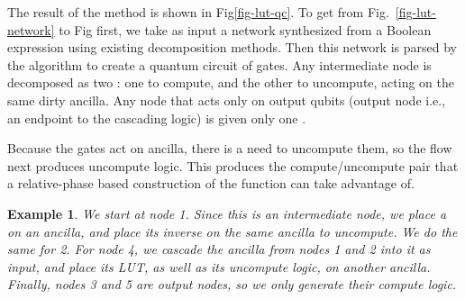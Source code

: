 \documentclass[paper]{ieice}
\newtheorem{example}{Example}
\providecommand{\DIFadd}[1]{{\protect\color{blue}{#1}}} %
\providecommand{\DIFaddbegin}{} %
\providecommand{\DIFaddend}{} %
\newcommand{\DIFaddincludegraphics}[2][]{{\color{blue}\fbox{\DIFOincludegraphics[#1]{#2}}}} %
\DeclareRobustCommand{\DIFaddbegin}{\DIFOaddbegin \let\includegraphics\DIFaddincludegraphics} %
\DeclareRobustCommand{\DIFaddend}{\DIFOaddend \let\includegraphics\DIFOincludegraphics} %
\begin{document}
The result of the method is shown in Fig\DIFaddbegin \DIFadd{. }\DIFaddend \ref{fig-lut-qc}. To get from Fig.~\ref{fig-lut-network} to Fig \DIFaddbegin \DIFadd{.~\ref{fig-lut-qc}, }\DIFaddend first, we take as input a  \DIFaddbegin \DIFadd{Boolean logic }\DIFaddend network synthesized from a Boolean expression using existing  \DIFaddbegin \DIFadd{Boolean logic network }\DIFaddend decomposition methods. Then this  \DIFaddbegin \DIFadd{Boolean logic }\DIFaddend network is parsed by the algorithm to create a quantum circuit of  \DIFaddbegin \DIFadd{FCNOT }\DIFaddend gates. Any intermediate node is decomposed as two  \DIFaddbegin \DIFadd{FCNOTs }\DIFaddend : one to compute, and the other to uncompute, acting on the same dirty ancilla. Any node that acts only on output qubits (output node i.e., an endpoint to the cascading logic) is given only one  \DIFaddbegin \DIFadd{FCNOT }\DIFaddend .


Because the  \DIFaddbegin \DIFadd{FCNOT }\DIFaddend gates act on ancilla, there is a need to uncompute them, so the flow next produces uncompute logic. This produces the compute/uncompute pair that a relative-phase based construction of the function can take advantage of. 

\begin{example}
  \label{ex-lut}
  We start at node 1. Since this is an intermediate node, we place a  \DIFaddbegin \DIFadd{FCNOT }\DIFaddend on an ancilla, and place its inverse on the same ancilla to uncompute. We do the same for \DIFaddbegin \DIFadd{node }\DIFaddend 2. For node 4, we cascade the ancilla from nodes 1 and 2 into it as input, and place its LUT, as well as its uncompute logic, on another ancilla. Finally, nodes 3 and 5 are output nodes, so we only generate their compute logic.

  \DIFaddbegin \DIFadd{Note in this diagram we denote qubits that a gate does not act on as dashed lines running across the gate, as opposed to qubits it acts on which terminate at the edges.
}

\DIFaddend \end{example}





\end{document}
